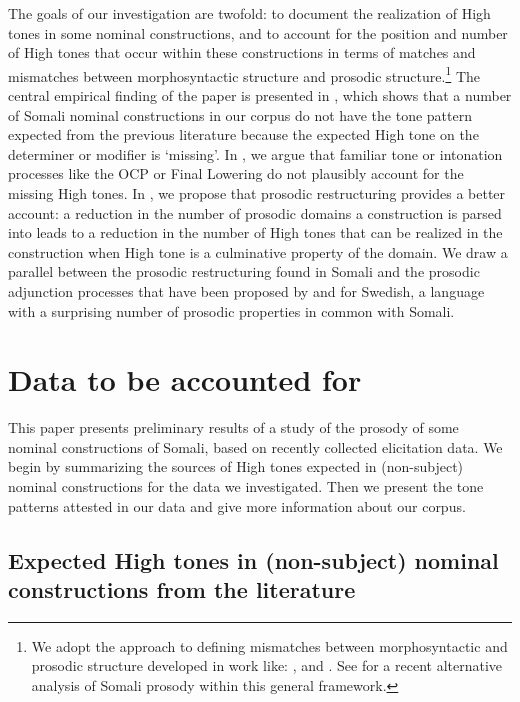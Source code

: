 \documentclass[output=paper]{langscibook}
\begin{document}
The goals of our investigation are twofold: to document the realization of High tones in some nominal constructions, and to account for the position and number of High tones that occur within these constructions in terms of matches and mismatches between morphosyntactic structure and prosodic structure.\footnote{We adopt the approach to defining mismatches between morphosyntactic and prosodic structure developed in work like: \citet{Downing1999,Downing2016,Inkelas1993,inkelas2014interplay,Ito2012,Ito2013,Nespor1986,Riad2012,Selkirk1986,selkirk2011syntax,Vigário2010}, and \citet{vogel2010phonology}. See \citet{Green2016} for a recent alternative analysis of Somali prosody within this general framework.} The central empirical finding of the paper is presented in , which shows that a number of Somali nominal constructions in our corpus do not have the tone pattern expected from the previous literature because the expected High tone on the determiner or modifier is ‘missing’. In  , we argue that familiar tone or intonation processes like the OCP or Final Lowering do not plausibly account for the missing High tones. In  , we propose that prosodic restructuring provides a better account: a reduction in the number of prosodic domains a construction is parsed into leads to a reduction in the number of High tones that can be realized in the construction when High tone is a culminative property of the domain. We draw a parallel between the prosodic restructuring found in Somali and the prosodic adjunction processes that have been proposed by \citet{Myrberg2015} and \citet{Riad2016} for Swedish, a language with a surprising number of prosodic properties in common with Somali.


\section{Data to be accounted for}
\label{sec:downing:2}
This paper presents preliminary results of a study of the prosody of some nominal constructions of Somali, based on recently collected elicitation data. We begin by summarizing the sources of High tones expected in (non-subject) nominal constructions for the data we investigated. Then we present the tone patterns attested in our data and give more information about our corpus.


 
\subsection{Expected High tones in (non-subject) nominal constructions from the literature}
\end{document}
